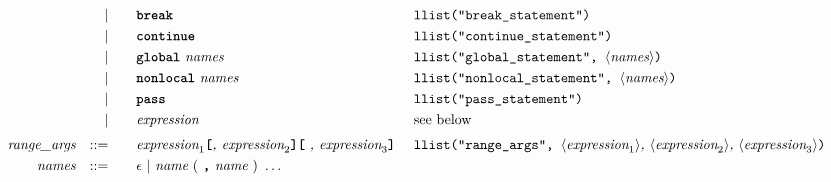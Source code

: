 \begin{alignat*}{9}
  &&                       && |   &\quad && \textbf{\texttt{break}}
                                                            && \texttt{llist("break\_statement")}                                                                                                                                     \\
  &&                       && |   &\quad && \textbf{\texttt{continue}}
                                                            && \texttt{llist("continue\_statement")}                                                                                                                                  \\
  &&                       && |   &\quad && \textbf{\texttt{global}}\ \textit{names}
                                                            && \texttt{llist("global\_statement",  } \langle \textit{names}\rangle \texttt{)}                                                                                          \\
  &&                       && |   &\quad && \textbf{\texttt{nonlocal}}\ \textit{names}
                                                            && \texttt{llist("nonlocal\_statement",  } \langle \textit{names}\rangle \texttt{)}                                                                                        \\
  &&                       && |   &\quad && \textbf{\texttt{pass}}
                                                            && \texttt{llist("pass\_statement")}                                                                                                                                      \\
  &&                       && |   &\quad && \textit{expression}
                                                            && \textrm{see below}                                                                                                                                                            \\[1mm]
  && \textit{range\_args}  && ::= &\quad && \textit{expression}_1 \textbf{\texttt{[}} \textit{, expression}_2 \textbf{\texttt{]}} \textbf{\texttt{[}} \ \textit{, expression}_3 \textbf{\texttt{]}} \
                                                            &&  \texttt{llist("range\_args",  } \langle \textit{expression}_1\rangle \textit{, } \langle \textit{expression}_2\rangle \textit{,}\ \langle \textit{expression}_3\rangle \texttt{)} \\
  && \textit{names}        && ::= &\quad && \epsilon\ | \  \textit{name} \ (\ \textbf{\texttt{,}} \ \textit{name}\ )\ \ldots

\end{alignat*}
